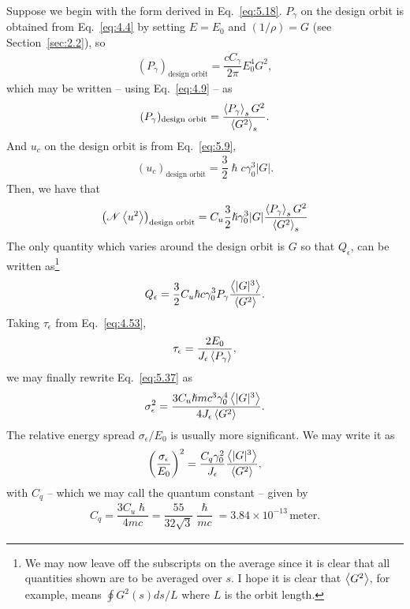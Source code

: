 Suppose we begin with the form derived in Eq.~\eqref{eq:5.18}. $P_\gamma$ on the design orbit is
obtained from Eq.~\eqref{eq:4.4} by setting $E = E_0$ and $(1/\rho) = G$ (see Section~\ref{sec:2.2}), so
\begin{align}
	(P_\gamma)_\text{design orbit} = \dfrac{c C_\gamma}{2\pi} E_0^4 G^2,
\end{align}
which may be written -- using Eq.~\eqref{eq:4.9} -- as
\begin{align}
	(P_\gamma)_\text{design orbit} = \dfrac{\left< P_\gamma \right>_s G^2}{\left< G^2 \right>_s}.
\end{align}
And $u_c$ on the design orbit is from Eq.~\eqref{eq:5.9},
\begin{align} \label{eq:5.40}
	(u_c)_\text{design orbit} = \dfrac{3}{2} \hslash c \gamma_0^3 |G|.
\end{align}
Then, we have that
\begin{align} \label{eq:5.41}
	\left( \mathscr{N} \left< u^2 \right> \right)_\text{design orbit} = C_u \dfrac{3}{2} \hslash \gamma_0^3 |G| \dfrac{\left< P_\gamma \right>_s G^2}{\left< G^2 \right>_s}
\end{align}
The only quantity which varies around the design orbit is $G$ so that $Q_\epsilon$, can be written as\footnote{We may now leave off the subscripts on the average since it is clear that all
quantities shown are to be averaged over $s$. I hope it is clear that $\left< G^2 \right>$, for example, means $\oint G^2(s)ds/L$ where $L$ is the orbit length.}
\begin{align}
	Q_\epsilon = \dfrac{3}{2} C_u \hslash c \gamma_0^3 P_\gamma \dfrac{\left< |G|^3 \right>}{\left< G^2 \right>}.
\end{align}
Taking $\tau_\epsilon$ from Eq.~\eqref{eq:4.53},
\begin{align}
	\tau_\epsilon = \dfrac{2E_0}{J_\epsilon \left< P_\gamma \right>},
\end{align}
we may finally rewrite Eq.~\eqref{eq:5.37} as
\begin{align}
	\sigma_\epsilon^2 = \dfrac{3 C_u \hslash mc^3 \gamma_0^4 \left< |G|^3 \right>}{4 J_\epsilon \left< G^2 \right>}.
\end{align}
The relative energy spread $\sigma_\epsilon/E_0$ is usually more significant. We may write it as
\begin{align}\label{eq:5.45}
	\left(\dfrac{\sigma_\epsilon}{E_0}\right)^2 = \dfrac{C_q \gamma_0^2}{J_\epsilon} \dfrac{\left< |G|^3 \right>}{\left< G^2 \right>},
\end{align}
with $C_q$ -- which we may call the quantum constant -- given by
\begin{align} \label{eq:5.46}
	C_q = \dfrac{3 C_u \hslash}{4mc} = \dfrac{55}{32\sqrt{3}} \dfrac{\hslash}{mc} = 3.84 \times 10^{-13}\,\text{meter}.
\end{align}
